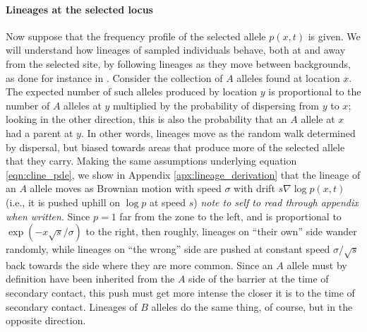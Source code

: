 \documentclass[12pt]{article}
\newcommand{\alisa}[1]{{\em \color{red} #1}}
\newcommand{\grad}{\nabla}
\begin{document}
\paragraph{Lineages at the selected locus}
Now suppose that the frequency profile of the selected allele $p(x,t)$ is given.
We will understand how lineages of sampled individuals behave,
both at and away from the selected site,
by following lineages as they move between backgrounds,
as done for instance in \citet{selectioncoal,Ralph2015}.
Consider the collection of $A$ alleles found at location $x$.
The expected number of such alleles produced by location $y$ is proportional to 
the number of $A$ alleles at $y$ multiplied by the probability of dispersing from $y$ to $x$;
looking in the other direction, this is also the probability that an $A$ allele at $x$ had a parent at $y$.
In other words, lineages move as the random walk determined by dispersal,
but biased towards areas that produce more of the selected allele that they carry.
Making the same assumptions underlying equation \eqref{eqn:cline_pde},
we show in Appendix \ref{apx:lineage_derivation}
that the lineage of an $A$ allele moves as Brownian motion with speed $\sigma$
with drift $s \grad \log p(x,t)$ (i.e., it is pushed uphill on $\log p$ at speed $s$) \alisa{note to self to read through appendix when written}.
Since $p=1$ far from the zone to the left, 
and is proportional to $\exp(-x\sqrt{s}/\sigma)$ to the right,
then roughly, lineages on ``their own'' side wander randomly,
while lineages on ``the wrong'' side are pushed at constant speed $\sigma/\sqrt{s}$ 
back towards the side where they are more common.
Since an $A$ allele must by definition have been inherited from the $A$ side of the barrier 
at the time of secondary contact,
this push must get more intense the closer it is to the time of secondary contact.
Lineages of $B$ alleles do the same thing, of course, but in the opposite direction.
\end{document}
